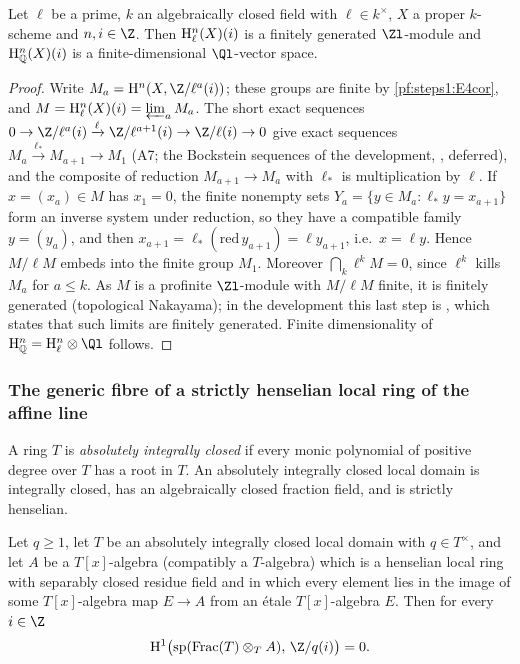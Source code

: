\begin{lemma}\label{pf:steps1:vfin}
Let $\ell$ be a prime, $k$ an algebraically closed field with $\ell\in k^\times$, $X$ a proper $k$-scheme and
$n,i\in\Z$. Then $\mathrm{H}_{\ell}^n(X)(i)$ is a finitely generated $\Zl$-module and $\mathrm{H}_{\mathbb{Q}}^n(X)(i)$ is a
finite-dimensional $\Ql$-vector space.
 
\end{lemma}

\begin{proof}
Write $M_a=\stepsIH^n(X,\Z/\ell^a(i))$; these groups are finite by \cref{pf:steps1:E4cor}, and
$M=\mathrm{H}_{\ell}^n(X)(i)=\varprojlim_aM_a$. The short exact sequences
$0\to\Z/\ell^a(i)\xrightarrow{\ell}\Z/\ell^{a+1}(i)\to\Z/\ell(i)\to0$ give exact sequences
$M_a\xrightarrow{\ell_*}M_{a+1}\to M_1$ (A7; the Bockstein sequences of the development,
, deferred), and the composite of
reduction $M_{a+1}\to M_a$ with $\ell_*$ is multiplication by $\ell$. If $x=(x_a)\in M$ has $x_1=0$, the finite
nonempty sets $Y_a=\{y\in M_a:\ell_*y=x_{a+1}\}$ form an inverse system under reduction, so they have a compatible
family $y=(y_a)$, and then $x_{a+1}=\ell_*(\mathrm{red}\,y_{a+1})=\ell y_{a+1}$, i.e.\ $x=\ell y$. Hence $M/\ell M$
embeds into the finite group $M_1$. Moreover $\bigcap_k\ell^kM=0$, since $\ell^k$ kills $M_a$ for $a\le k$. As $M$ is
a profinite $\Zl$-module with $M/\ell M$ finite, it is finitely generated (topological Nakayama); in the
development this last step is , which states that such limits
are finitely generated. Finite dimensionality of $\stepsIHQ^n=\stepsIHl^n\otimes\Ql$ follows.
\end{proof}

\subsubsection{The generic fibre of a strictly henselian local ring of the affine line}

A ring $T$ is \emph{absolutely integrally closed} if every monic polynomial of positive degree over $T$ has a root
in $T$. An absolutely integrally closed local domain is integrally closed, has an algebraically closed fraction
field, and is strictly henselian.

\begin{theorem}\label{pf:steps1:genfib}
Let $q\ge1$, let $T$ be an absolutely integrally closed local domain with $q\in T^\times$, and let $A$ be a
$T[x]$-algebra (compatibly a $T$-algebra) which is a henselian local ring with separably closed residue field and in
which every element lies in the image of some $T[x]$-algebra map $E\to A$ from an \'etale $T[x]$-algebra $E$. Then
for every $i\in\Z$
\[
 \stepsIH^1\bigl(\stepsIsp(\mathrm{Frac}(T)\otimes_TA),\,\Z/q(i)\bigr)=0 .
\]
\end{theorem}

